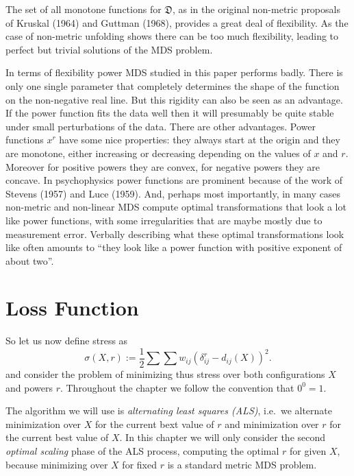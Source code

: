 \documentclass[
  12pt,
]{article}
\begin{document}
The set of all monotone functions for \(\mathfrak{D}\),
as in the original non-metric proposals of Kruskal (1964) and Guttman (1968),
provides a great deal of flexibility. As the case of non-metric unfolding
shows there can be too much flexibility, leading to perfect but trivial
solutions of the MDS problem.

In terms of flexibility power MDS studied in this paper performs badly. There
is only one single parameter that completely determines the shape of the function on the non-negative real line. But this rigidity can also be seen as an advantage. If the
power function fits the data well then it will presumably be quite stable
under small perturbations of the data. There are other advantages. Power functions \(x^r\) have some
nice properties: they always start at the origin and they are monotone,
either increasing or decreasing depending on the values of \(x\) and \(r\). Moreover for positive powers they are convex, for
negative powers they are concave. In psychophysics power functions are
prominent because of the work of Stevens (1957) and Luce (1959). And, perhaps most
importantly, in many cases non-metric and non-linear MDS compute optimal
transformations that look a lot like power functions, with some irregularities
that are maybe mostly due to measurement error. Verbally describing what these
optimal transformations look like often amounts to ``they look like a power
function with positive exponent of about two''.

\section{Loss Function}\label{loss-function}

So let us now define stress as
\begin{equation}
\sigma(X, r):=\frac12\sum\sum w_{ij}(\delta_{ij}^r-d_{ij}(X))^2.
\label{eq:rstressdef}
\end{equation}
and consider the problem of minimizing thus stress over both configurations
\(X\) and powers \(r\). Throughout the chapter we follow the convention
that \(0^0=1\).

The algorithm we will use is \emph{alternating least squares (ALS)}, i.e.~we alternate minimization over \(X\) for the
current bext value of \(r\) and minimization over \(r\) for the
current best value of \(X\). In this chapter we will only
consider the second \emph{optimal scaling} phase of the ALS process, computing the optimal \(r\) for given \(X\), because minimizing over \(X\) for fixed \(r\) is a standard metric MDS problem.
\end{document}

